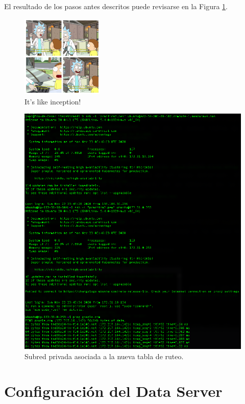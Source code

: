 \documentclass{article}
\begin{document}
El resultado de los pasos antes descritos puede
revisarse en la Figura \ref{fig:NAT-result}.
\begin{figure}[H]
  \centering
  \includegraphics[width=0.35\textwidth]{SSNAT/inception}
  \caption{It's like inception!}
\end{figure}

\begin{figure}[H]
  \centering
  \includegraphics[width=\textwidth]{SSNAT/result}
  \caption{Subred privada asociada a la nueva tabla
  de ruteo.}
  \label{fig:NAT-result}
\end{figure}

\newpage

\section {Configuración del Data Server}
\end{document}
